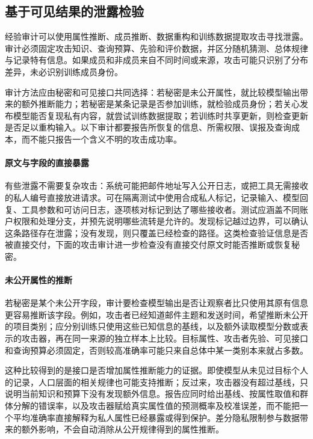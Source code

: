 \subsection{基于可见结果的泄露检验}
\label{sec:privacy-leakage-audit}

经验审计可以使用属性推断、成员推断、数据重构和训练数据提取攻击寻找泄露。审计必须固定攻击知识、查询预算、先验和评价数据，并区分随机猜测、总体规律与记录特有信息。如果成员和非成员来自不同时间或来源，攻击可能只识别了分布差异，未必识别训练成员身份。

审计方法应由秘密和可见接口共同选择：若秘密是未公开属性，就比较模型输出带来的额外推断能力；若秘密是某条记录是否参加训练，就检验成员身份；若关心发布模型能否复现私有内容，就尝试训练数据提取；若训练时共享更新，则检查更新是否足以重构输入。以下审计都要报告所恢复的信息、所需权限、误报及查询成本，而不能只报告一个含义不明的攻击成功率。

\paragraph{原文与字段的直接暴露}

有些泄露不需要复杂攻击：系统可能把邮件地址写入公开日志，或把工具无需接收的私人编号直接放进请求。可在隔离测试中使用合成私人标记，记录输入、模型回复、工具参数和可访问日志，逐项核对标记到达了哪些接收者。测试应涵盖不同账户权限和处理分支，并预先说明哪些流转是允许的。发现标记越过边界，可以确认这条路径存在泄露；没有发现，则只覆盖已经检查的路径。这类检查验证信息是否被直接交付，下面的攻击审计进一步检查没有直接交付原文时能否推断或恢复秘密。

\paragraph{未公开属性的推断}

若秘密是某个未公开字段，审计要检查模型输出是否让观察者比只使用其原有信息更容易推断该字段。例如，攻击者已经知道邮件主题和发送时间，希望推断未公开的项目类别；应分别训练只使用这些已知信息的基线，以及额外读取模型分数或表示的攻击器，再在同一来源的独立样本上比较。目标属性、攻击者先验、可见接口和查询预算必须固定，否则较高准确率可能只来自总体中某一类别本来就占多数。

这种比较得到的是接口是否增加属性推断能力的证据。即使模型从未见过目标个人的记录，人口层面的相关规律也可能支持推断；反过来，攻击器没有超过基线，只说明当前知识和预算下没有发现额外信息。报告应同时给出基线、按属性取值和群体分解的错误率，以及攻击器赋给真实属性值的预测概率及校准误差，而不能把一个平均准确率直接解释为私人属性已经暴露或得到保护。差分隐私限制参与数据带来的额外影响，不会自动消除从公开规律得到的属性推断。

